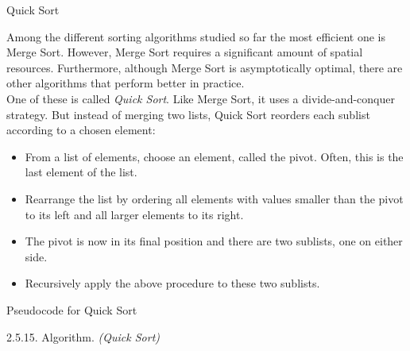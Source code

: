 \documentclass[smaller,hyperref={CJKbookmarks=true}]{beamer}
\newcounter{zhuo}[subsection]
\begin{document}
\begin{frame}[t]{Quick Sort}
\begin{spacing}{1.1}
Among the different sorting algorithms studied so far the most efficient
one is Merge Sort. However, Merge Sort requires a significant amount of
spatial resources. Furthermore, although Merge Sort is asymptotically
optimal, there are other algorithms that perform better in practice.\\[6pt]
One of these is called \emph{Quick Sort}. Like Merge Sort, it uses a
divide-and-conquer strategy. But instead of merging two lists, Quick Sort
reorders each sublist according to a chosen element:
\begin{itemize}
  \item From a list of elements, choose an element, called the pivot. Often, this is the last element of the list.
  \item Rearrange the list by ordering all elements with values smaller than the pivot to its left and all larger elements to its right.
  \item The pivot is now in its final position and there are two sublists, one on either side.
  \item Recursively apply the above procedure to these two sublists.
\end{itemize}
\end{spacing}
\end{frame}
\begin{frame}[t]{Pseudocode for Quick Sort}
\begin{spacing}{1.1}
\alert{2.5.15. Algorithm.} \emph{(Quick Sort)}
\IncMargin{1em}
\begin{algorithm}[H]
\end{algorithm}\DecMargin{1em}
\end{spacing}
\end{frame}
\end{document}
